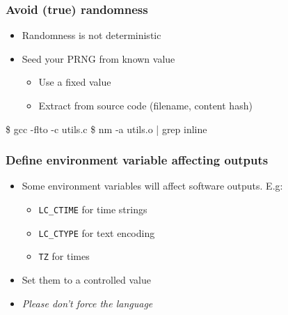 \documentclass[14pt,aspectratio=169]{beamer}
\begin{document}
{
\begin{frame}[fragile]
 \frametitle{Avoid (true) randomness}

 \begin{itemize}
  \item Randomness is not deterministic
  \item<2-> Seed your PRNG from known value
   \begin{itemize}
     \item Use a fixed value
     \item<3> Extract from source code (filename, content hash)
   \end{itemize}
 \end{itemize}

 \begin{example}
\begin{semiverbatim}\small
\$ gcc -flto -c utils.c
\$ nm -a utils.o | grep inline
\end{semiverbatim}
 \end{example}
\end{frame}
}

\begin{frame}
 \frametitle{Define environment variable affecting outputs}

 \begin{itemize}
  \item Some environment variables will affect software outputs. E.g:
   \begin{itemize}
    \item \texttt{LC\_CTIME} for time strings
    \item \texttt{LC\_CTYPE} for text encoding
    \item \texttt{TZ} for times
   \end{itemize}
  \item<2-> Set them to a controlled value
  \item<3> \textit{Please don't force the language}
 \end{itemize}
\end{frame}
\end{document}
